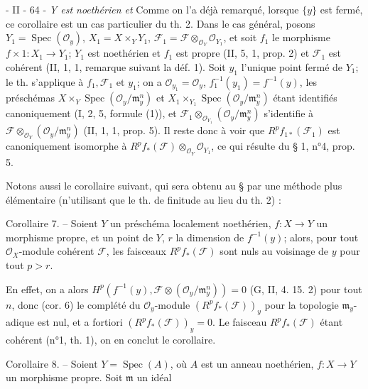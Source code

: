 \newpage


\noindent - II - 64 -
\emph{Y est noethérien et}
Comme on l'a déjà remarqué, lorsque $\{y\}$ est fermé, ce corollaire est un cas particulier du th. 2. Dans le cas général, posons $Y_1 = \operatorname{Spec}(\mathcal{O}_y)$, $X_1 = X \times_Y Y_1$, $\mathcal{F}_1 = \mathcal{F} \otimes_{\mathcal{O}_Y} \mathcal{O}_{Y_1}$, et soit $f_1$ le morphisme $f \times 1 : X_1 \to Y_1$; $Y_1$ est noethérien et $f_1$ est propre (II, 5, 1, prop. 2) et $\mathcal{F}_1$ est cohérent (II, 1, 1, remarque suivant la déf. 1). Soit $y_1$ l'unique point fermé de $Y_1$; le th. s'applique à $f_1, \mathcal{F}_1$ et $y_1$; on a $\mathcal{O}_{y_1} = \mathcal{O}_y$, $f_1^{-1}(y_1) = f^{-1}(y)$, les préschémas $X \times_Y \operatorname{Spec}(\mathcal{O}_y/\mathfrak{m}_y^n)$ et $X_1 \times_{Y_1} \operatorname{Spec}(\mathcal{O}_y/\mathfrak{m}_y^n)$ étant identifiés canoniquement (I, 2, 5, formule (1)), et $\mathcal{F}_1 \otimes_{\mathcal{O}_{Y_1}} (\mathcal{O}_y/\mathfrak{m}_y^n)$ s'identifie à $\mathcal{F} \otimes_{\mathcal{O}_Y} (\mathcal{O}_y/\mathfrak{m}_y^n)$ (II, 1, 1, prop. 5). Il reste donc à voir que $R^p f_{1*}(\mathcal{F}_1)$ est canoniquement isomorphe à $R^p f_*(\mathcal{F}) \otimes_{\mathcal{O}_Y} \mathcal{O}_{Y_1}$, ce qui résulte du § 1, n°4, prop. 5.

Notons aussi le corollaire suivant, qui sera obtenu au § par une méthode plus élémentaire (n'utilisant que le th. de finitude au lieu du th. 2) :

Corollaire 7. -- Soient $Y$ un préschéma localement noethérien, $f: X \to Y$ un morphisme propre, et un point de $Y$, $r$ la dimension de $f^{-1}(y)$; alors, pour tout $\mathcal{O}_X$-module cohérent $\mathcal{F}$, les faisceaux $R^p f_*(\mathcal{F})$ sont nuls au voisinage de $y$ pour tout $p > r$.

En effet, on a alors $H^p(f^{-1}(y), \mathcal{F} \otimes (\mathcal{O}_y/\mathfrak{m}_y^n)) = 0$ (G, II, 4. 15. 2) pour tout $n$, donc (cor. 6) le complété du $\mathcal{O}_y$-module $(R^p f_*(\mathcal{F}))_y$ pour la topologie $\mathfrak{m}_y$-adique est nul, et a fortiori $(R^p f_*(\mathcal{F}))_y = 0$. Le faisceau $R^p f_*(\mathcal{F})$ étant cohérent (n°1, th. 1), on en conclut le corollaire.

Corollaire 8. -- Soient $Y = \operatorname{Spec}(A)$, où $A$ est un anneau noethérien, $f: X \to Y$ un morphisme propre. Soit $\mathfrak{m}$ un idéal

\newpage

